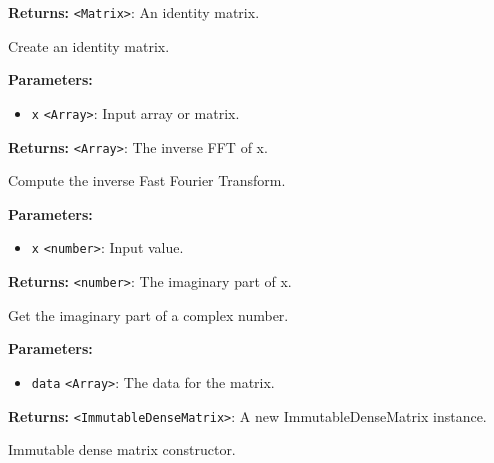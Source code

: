 \documentclass[12pt,a4paper]{article}
\begin{document}
\noindent \textbf{Returns:} \texttt{<Matrix>}: An identity matrix.

\noindent Create an identity matrix.

\vspace{5mm}
\noindent {}


\noindent \textbf{Parameters:}
\begin{itemize}
  \item \texttt{x} \texttt{<Array>}: Input array or matrix.
\end{itemize}

\noindent \textbf{Returns:} \texttt{<Array>}: The inverse FFT of x.

\noindent Compute the inverse Fast Fourier Transform.

\vspace{5mm}
\noindent {}


\noindent \textbf{Parameters:}
\begin{itemize}
  \item \texttt{x} \texttt{<number>}: Input value.
\end{itemize}

\noindent \textbf{Returns:} \texttt{<number>}: The imaginary part of x.

\noindent Get the imaginary part of a complex number.

\vspace{5mm}
\noindent {}


\noindent \textbf{Parameters:}
\begin{itemize}
  \item \texttt{data} \texttt{<Array>}: The data for the matrix.
\end{itemize}

\noindent \textbf{Returns:} \texttt{<ImmutableDenseMatrix>}: A new ImmutableDenseMatrix instance.

\noindent Immutable dense matrix constructor.

\vspace{5mm}
\noindent {}
\end{document}
